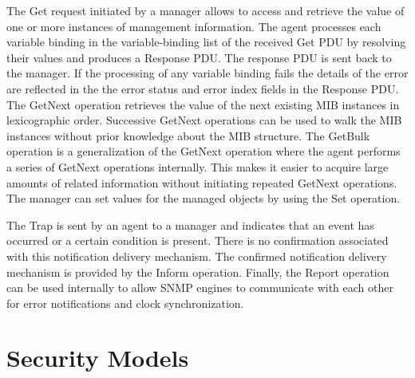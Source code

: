 The Get request initiated by a manager allows to access and retrieve the value of one or more instances of management information. The agent processes each variable binding in the variable-binding list of the received Get PDU by resolving their values and produces a Response PDU. The response PDU is sent back to the manager. If the processing of any variable binding fails the details of the error are reflected in the the error status and error index fields in the Response PDU. The GetNext operation retrieves the value of the next existing MIB instances in lexicographic order. Successive GetNext operations can be used to walk the MIB instances without prior knowledge about the MIB structure. The GetBulk operation is a generalization of the GetNext operation where the agent performs a series of GetNext operations internally. This makes it easier to acquire large amounts of related information without initiating repeated GetNext operations. The manager can set values for the managed objects by using the Set operation.

The Trap is sent by an agent to a manager and indicates that an event has occurred or a certain condition is present. There is no confirmation associated with this notification delivery mechanism. The confirmed notification delivery mechanism is provided by the Inform operation. Finally, the Report operation can be used internally to allow SNMP engines to communicate with each other for error notifications and clock synchronization.



\section{Security Models}

